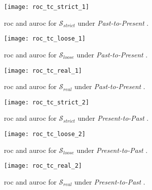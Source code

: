 \color{red}

\begin{figure}[h!]
	\centering
	\texttt{[image: roc\_tc\_strict\_1]}
	\caption{\gls{roc} and \gls{auroc} for $\mathcal{S}_{strict}$ under \textit{Past-to-Present} .}
	\label{fig:roc_tc_strict_1}
\end{figure}

\begin{figure}[h!]
	\centering
	\texttt{[image: roc\_tc\_loose\_1]}
	\caption{\gls{roc} and \gls{auroc} for $\mathcal{S}_{loose}$ under \textit{Past-to-Present} .}
	\label{fig:roc_tc_loose_1}
\end{figure}

\begin{figure}[h!]
	\centering
	\texttt{[image: roc\_tc\_real\_1]}
	\caption{\gls{roc} and \gls{auroc} for $\mathcal{S}_{real}$ under \textit{Past-to-Present} .}
	\label{fig:roc_tc_real_1}
\end{figure}

\begin{figure}[h!]
	\centering
	\texttt{[image: roc\_tc\_strict\_2]}
	\caption{\gls{roc} and \gls{auroc} for $\mathcal{S}_{strict}$ under \textit{Present-to-Past} .}
	\label{fig:roc_tc_strict_2}
\end{figure}

\begin{figure}[h!]
	\centering
	\texttt{[image: roc\_tc\_loose\_2]}
	\caption{\gls{roc} and \gls{auroc} for $\mathcal{S}_{loose}$ under \textit{Present-to-Past} .}
	\label{fig:roc_tc_loose_2}
\end{figure}

\begin{figure}[h!]
	\centering
	\texttt{[image: roc\_tc\_real\_2]}
	\caption{\gls{roc} and \gls{auroc} for $\mathcal{S}_{real}$ under \textit{Present-to-Past} .}
	\label{fig:roc_tc_real_2}
\end{figure}